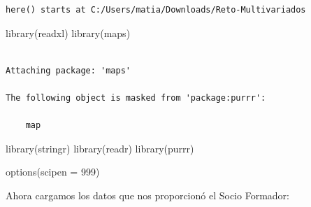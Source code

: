\documentclass[
  letterpaper,
  DIV=11,
  numbers=noendperiod]{scrartcl}
\newenvironment{Shaded}{\begin{snugshade}}{\end{snugshade}}
\newcommand{\AttributeTok}[1]{\textcolor[rgb]{0.40,0.45,0.13}{#1}}
\newcommand{\DecValTok}[1]{\textcolor[rgb]{0.68,0.00,0.00}{#1}}
\newcommand{\FunctionTok}[1]{\textcolor[rgb]{0.28,0.35,0.67}{#1}}
\newcommand{\NormalTok}[1]{\textcolor[rgb]{0.00,0.23,0.31}{#1}}
\begin{document}
\begin{verbatim}
here() starts at C:/Users/matia/Downloads/Reto-Multivariados
\end{verbatim}

\begin{Shaded}
\begin{Highlighting}[]
\FunctionTok{library}\NormalTok{(readxl)}
\FunctionTok{library}\NormalTok{(maps)}
\end{Highlighting}
\end{Shaded}

\begin{verbatim}

Attaching package: 'maps'

The following object is masked from 'package:purrr':

    map
\end{verbatim}

\begin{Shaded}
\begin{Highlighting}[]
\FunctionTok{library}\NormalTok{(stringr)}
\FunctionTok{library}\NormalTok{(readr)}
\FunctionTok{library}\NormalTok{(purrr)}


\FunctionTok{options}\NormalTok{(}\AttributeTok{scipen =} \DecValTok{999}\NormalTok{)}
\end{Highlighting}
\end{Shaded}

Ahora cargamos los datos que nos proporcionó el Socio Formador:
\end{document}
